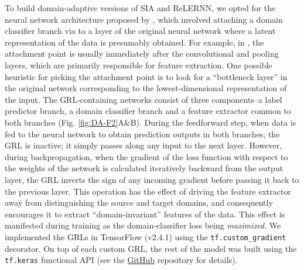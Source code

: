 To build domain-adaptive versions of \ac{SIA} and ReLERNN, we opted for the neural network architecture proposed by \cite{ganin_unsupervised_2014}, which involved attaching a domain classifier branch via  to a layer of the original neural network where a latent representation of the data is presumably obtained. For example, in , the attachment point is usually immediately after the convolutional and pooling layers, which are primarily responsible for feature extraction. One possible heuristic for picking the attachment point is to look for a “bottleneck layer” in the original network corresponding to the lowest-dimensional representation of the input. The \ac{GRL}-containing networks consist of three components–a label predictor branch, a domain classifier branch and a feature extractor common to both branches (Fig. \ref{fig:DA-F2}A\&B). During the feedforward step, when data is fed to the neural network to obtain prediction outputs in both branches, the \ac{GRL} is inactive; it simply passes along any input to the next layer. However, during backpropagation, when the gradient of the loss function with respect to the weights of the network is calculated iteratively backward from the output layer, the \ac{GRL} inverts the sign of any incoming gradient before passing it back to the previous layer. This operation has the effect of driving the feature extractor away from distinguishing the source and target domains, and consequently encourages it to extract “domain-invariant” features of the data. This effect is manifested during training as the domain-classifier loss being \textit{maximized}. We implemented the \acp{GRL} in TensorFlow (v2.4.1) using the \texttt{tf.custom\_gradient} decorator. On top of each custom \ac{GRL}, the rest of the model was built using the \texttt{tf.keras} functional API (see the \href{https://github.com/ziyimo/popgen-dom-adapt}{GitHub} repository for details).

